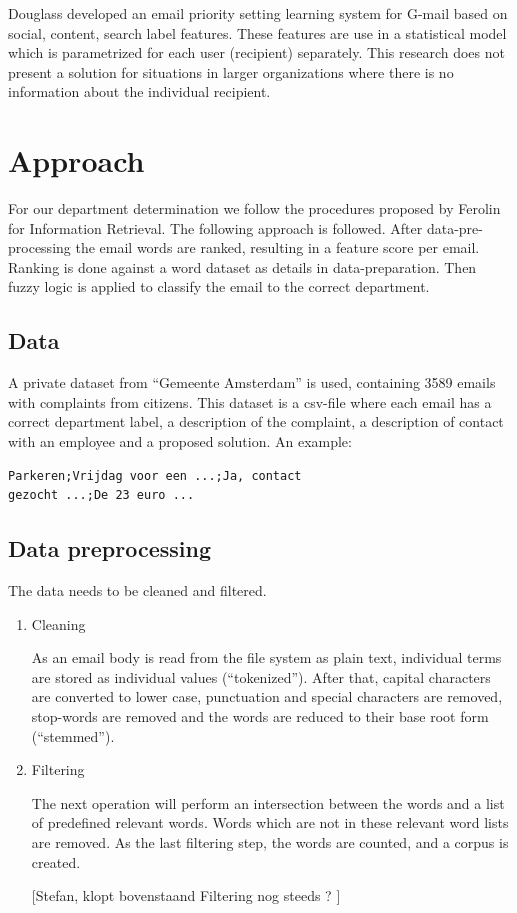 \documentclass[journal]{IEEEtran}
\begin{document}
Douglass \cite{ranking} developed an email priority setting learning system for G-mail based on social, content, search label features. These features are use in a statistical model which is parametrized for each user (recipient) separately. This research does not present a solution for situations in larger organizations where there is no information about the individual recipient.

\section{Approach}
For our department determination we follow the procedures proposed by Ferolin for Information Retrieval. The following approach is followed. After data-pre-processing the email words are ranked, resulting in a feature score per email. Ranking is done against a word dataset as details in data-preparation. Then fuzzy logic is applied to classify the email to the correct department.

\subsection{Data}

A private dataset from ``Gemeente Amsterdam'' is used, containing 3589 emails with complaints from citizens.
This dataset is a csv-file where each email has a correct department label, a description of the complaint, a description of contact with an employee and a proposed solution.
An example:
\begin{lstlisting}
Parkeren;Vrijdag voor een ...;Ja, contact
gezocht ...;De 23 euro ...
\end{lstlisting}

\subsection{Data preprocessing}
The data needs to be cleaned and filtered.

\begin{enumerate}
    \item Cleaning

    As an email body is read from the file system as plain text, individual terms are stored as individual values (``tokenized''). After that, capital characters are converted to lower case, punctuation and special characters are removed, stop-words are removed and the words are reduced to their base root form (``stemmed'').

    \item Filtering

    The next operation will perform an intersection between the words and a list of predefined relevant words. Words which are not in these relevant word lists are removed. As the last filtering step, the words are counted, and a corpus is created.
    
    [Stefan, klopt bovenstaand Filtering nog steeds ? ]

\end{enumerate}
\end{document}
